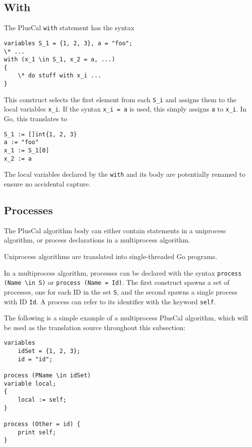 \subsection{With}
The PlusCal \texttt{with} statement has the syntax

\noindent
\begin{minipage}[t]{\textwidth}
\begin{lstlisting}[language=pcal]
variables S_1 = {1, 2, 3}, a = "foo";
\* ...
with (x_1 \in S_1, x_2 = a, ...)
{
	\* do stuff with x_i ...
}
\end{lstlisting}
\end{minipage}

This construct selects the first element from each \texttt{S\_i} and assigns them to the local variables \texttt{x\_i}. If the syntax \texttt{x\_i = a} is used, this simply assigns \texttt{a} to \texttt{x\_i}. In Go, this translates to

\noindent
\begin{minipage}[t]{\textwidth}
\begin{lstlisting}[language=golang]
S_1 := []int{1, 2, 3}
a := "foo"
x_1 := S_1[0]
x_2 := a
\end{lstlisting}
\end{minipage}

The local variables declared by the \texttt{with} and its body are potentially renamed to ensure no accidental capture.

\subsection{Processes}
The PlusCal algorithm body can either contain statements in a uniprocess algorithm, or process declarations in a multiprocess algorithm.

Uniprocess algorithms are translated into single-threaded Go programs.

In a multiprocess algorithm, processes can be declared with the syntax \verb|process (Name \in S)| or \verb|process (Name = Id)|. The first construct spawns a set of processes, one for each ID in the set \texttt{S}, and the second spawns a single process with ID \texttt{Id}. A process can refer to its identifier with the keyword \texttt{self}.

The following is a simple example of a multiprocess PlusCal algorithm, which will be used as the translation source throughout this subsection:

\noindent
\begin{minipage}[t]{\textwidth}
	\begin{lstlisting}[language=pcal]
variables
	idSet = {1, 2, 3};
	id = "id";

process (PName \in idSet)
variable local;
{
	local := self;
}

process (Other = id) {
	print self;
}
	\end{lstlisting}
\end{minipage}

